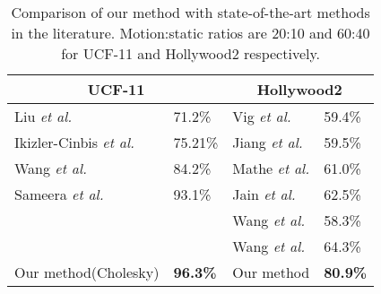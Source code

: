\begin{table}[]
\centering
\caption{Comparison of our method with state-of-the-art methods in the literature. Motion:static ratios are 20:10 and 60:40 for
UCF-11 and Hollywood2 respectively.}\label{tbl:comparison}
\begin{tabular}{|l|l||l|l|}
\hline
\multicolumn{2}{|c||}{UCF-11}    & \multicolumn{2}{c|}{Hollywood2} \\ \hline
Liu \textit{et al.}\cite{liu2009recognizing}            & 71.2\%  & Vig \textit{et al.}\cite{vig2012space}           & 59.4\%      \\
Ikizler-Cinbis \textit{et al.}\cite{ikizler2010object} & 75.21\% & Jiang \textit{et al.}\cite{jiang2012trajectory}      & 59.5\%      \\
Wang \textit{et al.}\cite{wang2011action}    & 84.2\%  & Mathe \textit{et al.}\cite{mathe2012dynamic}         & 61.0\%      \\
Sameera \textit{et al.}\cite{7486474}         & 93.1\%        & Jain \textit{et al.}\cite{jain2013better}           & 62.5\%      \\
                      &         & Wang \textit{et al.}\cite{wang2011action}             & 58.3\%      \\
                      &         & Wang \textit{et al.}\cite{wang2013action}          & 64.3\%      \\ \hline \hline
Our method(Cholesky)  & \textbf{96.3\%}       & Our method        &        \textbf{80.9\%}       \\ \hline

\end{tabular}

\end{table}



